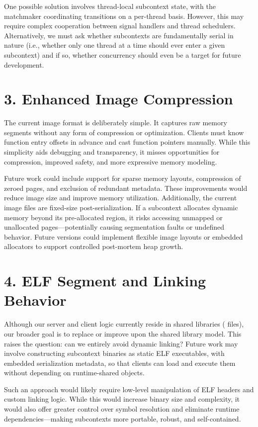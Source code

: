One possible solution involves thread-local subcontext state, with the matchmaker coordinating transitions on a per-thread basis. However, this may require complex cooperation between signal handlers and thread schedulers. Alternatively, we must ask whether subcontexts are fundamentally serial in nature (i.e., whether only one thread at a time should ever enter a given subcontext) and if so, whether concurrency should even be a target for future development.

\section*{3. Enhanced Image Compression}
The current image format is deliberately simple. It captures raw memory segments without any form of compression or optimization. Clients must know function entry offsets in advance and cast function pointers manually. While this simplicity aids debugging and transparency, it misses opportunities for compression, improved safety, and more expressive memory modeling.

Future work could include support for sparse memory layouts, compression of zeroed pages, and exclusion of redundant metadata. These improvements would reduce image size and improve memory utilization. Additionally, the current image files are fixed-size post-serialization. If a subcontext allocates dynamic memory beyond its pre-allocated region, it risks accessing unmapped or unallocated pages—potentially causing segmentation faults or undefined behavior. Future versions could implement flexible image layouts or embedded allocators to support controlled post-mortem heap growth.

\section*{4. ELF Segment and Linking Behavior}
Although our server and client logic currently reside in shared libraries ( files), our broader goal is to replace or improve upon the shared library model. This raises the question: can we entirely avoid dynamic linking? Future work may involve constructing subcontext binaries as static ELF executables, with embedded serialization metadata, so that clients can load and execute them without depending on runtime-shared objects.

Such an approach would likely require low-level manipulation of ELF headers and custom linking logic. While this would increase binary size and complexity, it would also offer greater control over symbol resolution and eliminate runtime dependencies—making subcontexts more portable, robust, and self-contained.


